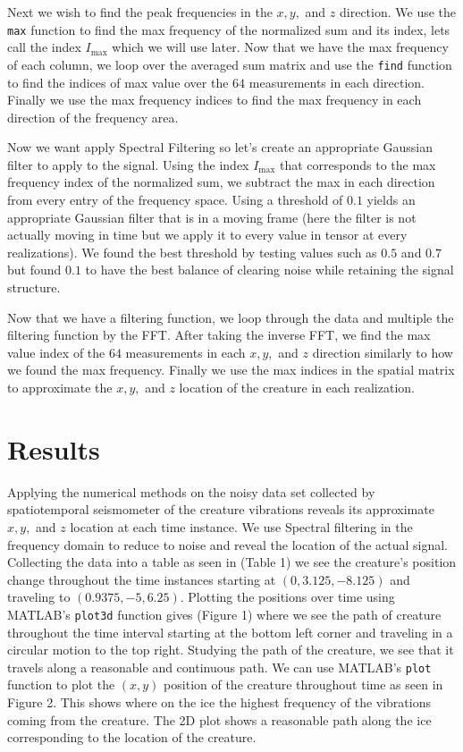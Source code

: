 \documentclass[12pt]{article}%
\numberwithin{equation}{subsection}
\begin{document}
Next we wish to find the peak frequencies in the $x,y,$ and $z$ direction. We use the \verb+max+ function to find the max frequency of the normalized sum and its index, lets call the index $I_{\text{max}}$ which we will use later. Now that we have the max frequency of each column, we loop over the averaged sum matrix and use the \verb+find+ function to find the indices of max value over the $64$ measurements in each direction. Finally we use the max frequency indices to find the max frequency in each direction of the frequency area. 

Now we want apply Spectral Filtering so let's create an appropriate Gaussian filter to apply to the signal. Using the index $I_{\text{max}}$ that corresponds to the max frequency index of the normalized sum, we subtract the max in each direction from every entry of the frequency space. Using a threshold of $0.1$ yields an appropriate Gaussian filter that is in a moving frame (here the filter is not actually moving in time but we apply it to every value in tensor at every realizations). We found the best threshold by testing values such as $0.5$ and $0.7$ but found $0.1$ to have the best balance of clearing noise while retaining the signal structure. 

Now that we have a filtering function, we loop through the data and multiple the filtering function by the FFT. After taking the inverse FFT, we find the max value index of the $64$ measurements in each $x,y,$ and $z$ direction similarly to how we found the max frequency. Finally we use the max indices in the spatial matrix to approximate the $x,y,$ and $z$ location of the creature in each realization.  



\section{Results}

Applying the numerical methods on the noisy data set collected by spatiotemporal seismometer of the creature vibrations reveals its approximate $x,y,$ and $z$ location at each time instance. We use Spectral filtering in the frequency domain to reduce to noise and reveal the location of the actual signal. Collecting the data into a table as seen in (Table 1) we see the creature's position change throughout the time instances starting at $(0,3.125,-8.125)$ and traveling to $(0.9375,-5,6.25)$. Plotting the positions over time using MATLAB's \verb+plot3d+ function gives (Figure 1) where we see the path of creature throughout the time interval starting at the bottom left corner and traveling in a circular motion to the top right. Studying the path of the creature, we see that it travels along a reasonable and continuous path. We can use MATLAB's \verb+plot+ function to plot the $(x,y)$ position of the creature throughout time as seen in Figure 2. This shows where on the ice the highest frequency of the vibrations coming from the creature. The 2D plot shows a reasonable path along the ice corresponding to the location of the creature.   
\end{document}
